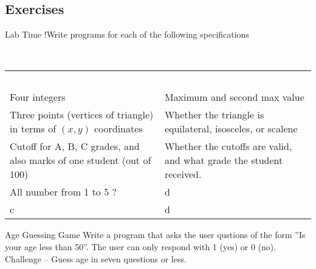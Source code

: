 \subsection{Exercises}

\begin{frame}[fragile]{Lab Time !}{Write programs for each of the following specifications}
    \begin{block}{~\vspace{0.5cm}}
    \begin{center}
    \vspace{-0.6cm}
    \begin{tabular}{p{}|p{}}
        \textcolor{white}{\bf Input} & \textcolor{white}{\bf Output} \\
        Four integers &
        Maximum and second max value \\ \hline
        Three points (vertices of triangle) in terms of $(x,y)$ coordinates &
        Whether the triangle is equilateral, isosceles, or scalene \\ \hline
        Cutoff for A, B, C grades, and also marks of one student (out of 100) &
        Whether the cutoffs are valid, and what grade the student received. \\ \hline
        All number from 1 to 5 ?  &
        d \\ \hline
        c &
        d
    \end{tabular}
    \end{center}
    \end{block}
    \begin{block}{Age Guessing Game}
        Write a program that asks the user qustions of the form
        ''Is your age less than 50''.
        The user can only respond with 1 (yes) or 0 (no).\\
        Challenge -- Guess age in seven questions or less.
    \end{block}
\end{frame}
